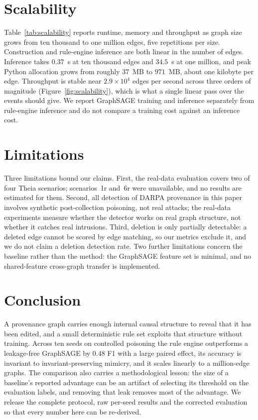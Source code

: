\documentclass[conference]{IEEEtran}
\begin{document}
\section{Scalability}
Table~\ref{tab:scalability} reports runtime, memory and throughput as graph size
grows from ten thousand to one million edges, five repetitions per size.
Construction and rule-engine inference are both linear in the number of edges.
Inference takes $0.37$~s at ten thousand edges and $34.5$~s at one million, and
peak Python allocation grows from roughly $37$~MB to $971$~MB, about one
kilobyte per edge. Throughput is stable near $2.9\times10^{4}$ edges per second
across three orders of magnitude (Figure~\ref{fig:scalability}), which is what a
single linear pass over the events should give. We report GraphSAGE training and
inference separately from rule-engine inference and do not compare a training
cost against an inference cost.

\section{Limitations}
Three limitations bound our claims. First, the real-data evaluation covers two
of four Theia scenarios; scenarios~1r and~6r were unavailable, and no results
are estimated for them. Second, all detection of DARPA provenance in this paper
involves synthetic post-collection poisoning, not real attacks; the real-data
experiments measure whether the detector works on real graph structure, not
whether it catches real intrusions. Third, deletion is only partially
detectable: a deleted edge cannot be scored by edge matching, so our metrics
exclude it, and we do not claim a deletion detection rate. Two further
limitations concern the baseline rather than the method: the GraphSAGE feature
set is minimal, and no shared-feature cross-graph transfer is implemented.

\section{Conclusion}
A provenance graph carries enough internal causal structure to reveal that it
has been edited, and a small deterministic rule set exploits that structure
without training. Across ten seeds on controlled poisoning the rule engine
outperforms a leakage-free GraphSAGE by $0.48$ F1 with a large paired effect,
its accuracy is invariant to invariant-preserving mimicry, and it scales
linearly to a million-edge graphs. The comparison also carries a methodological
lesson: the size of a baseline's reported advantage can be an artifact of
selecting its threshold on the evaluation labels, and removing that leak removes
most of the advantage. We release the complete protocol, raw per-seed results
and the corrected evaluation so that every number here can be re-derived.
\end{document}
